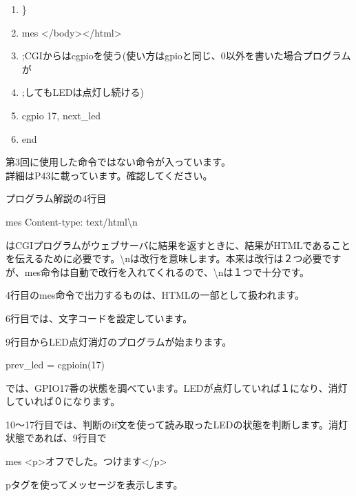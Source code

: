 \documentclass[a4paper,12pt,dvipdfmx]{jarticle}
\begin{document}
\begin{boxedminipage}{0.95\textwidth}
\begin{enumerate}
	\item \}

	\item mes {\textquotedbl}{\textless}/body{\textgreater}{\textless}/html{\textgreater}{\textquotedbl}

	\item ;CGIからはcgpioを使う(使い方はgpioと同じ、0以外を書いた場合プログラムが

	\item ;してもLEDは点灯し続ける)

	\item cgpio 17, next\_led

	\item end
	\end{enumerate}

\end{boxedminipage}
\flushleft



第3回に使用した命令ではない命令が入っています。\\
詳細はP43に載っています。確認してください。

プログラム解説の4行目

mes {\textquotedbl}Content-type: text/html{\textbackslash}n{\textquotedbl}

はCGIプログラムがウェブサーバに結果を返すときに、結果がHTMLであることを伝えるために必要です。{\textbackslash}nは改行を意味します。本来は改行は２つ必要ですが、mes命令は自動で改行を入れてくれるので、{\textbackslash}nは１つで十分です。


\bigskip
\clearpage
4行目のmes命令で出力するものは、HTMLの一部として扱われます。

\bigskip

6行目では、文字コードを設定しています。

\bigskip

9行目からLED点灯消灯のプログラムが始まります。

prev\_led = cgpioin(17)

では、GPIO17番の状態を調べています。LEDが点灯していれば１になり、消灯していれば０になります。


\bigskip


10〜17行目では、判断のif文を使って読み取ったLEDの状態を判断します。消灯状態であれば、9行目で

mes
	{\textquotedbl}{\textless}p{\textgreater}オフでした。つけます{\textless}/p{\textgreater}{\textquotedbl}

pタグを使ってメッセージを表示します。
\end{document}
